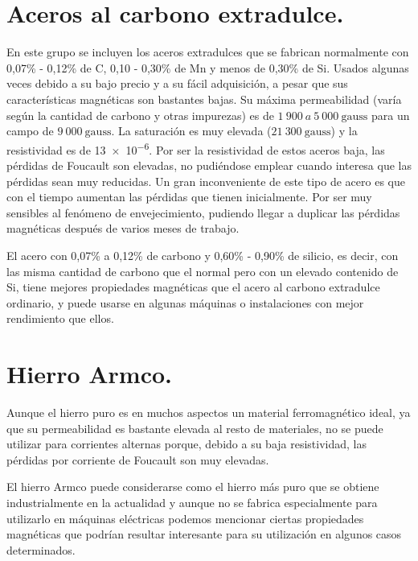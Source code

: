 \documentclass[12pt,a4paper]{article}
\begin{document}
\section{Aceros al carbono extradulce.}

En este grupo se incluyen los aceros extradulces que se fabrican normalmente con 0,07\% - 0,12\% de C, 0,10 - 0,30\% de Mn y menos de 0,30\% de Si. Usados algunas veces debido a su bajo precio y a su fácil adquisición, a pesar que sus características magnéticas son bastantes bajas. Su máxima permeabilidad (varía según la cantidad de carbono y otras impurezas) es de $1\ 900 \ a \ 5\  000 \ \mathrm{gauss}$ para un campo de $9\ 000 \ \mathrm{gauss}$. La saturación es muy elevada ($21\ 300 \ \mathrm{gauss}$) y la resistividad es de \SI{13e-6}{\Omega}. Por ser la resistividad de estos aceros baja, las pérdidas de Foucault son elevadas, no pudiéndose emplear cuando interesa que las pérdidas sean muy reducidas. Un gran inconveniente de este tipo de acero es que con el tiempo aumentan las pérdidas que tienen inicialmente. Por ser muy sensibles al fenómeno de envejecimiento, pudiendo llegar a duplicar las pérdidas magnéticas después de varios meses de trabajo.

El acero con 0,07\% a 0,12\% de carbono y 0,60\% - 0,90\% de silicio, es decir, con las misma cantidad de carbono que el normal pero con un elevado contenido de Si, tiene mejores propiedades magnéticas que el acero al carbono extradulce ordinario, y puede usarse en algunas máquinas o instalaciones con mejor rendimiento que ellos.

\section{Hierro Armco.}

Aunque el hierro puro es en muchos aspectos un material ferromagnético ideal, ya que su permeabilidad es bastante elevada al resto de materiales, no se puede utilizar para corrientes alternas porque, debido a su baja resistividad, las pérdidas por corriente de Foucault son muy elevadas.

El hierro Armco puede considerarse como el hierro más puro que se obtiene industrialmente en la actualidad y aunque no se fabrica especialmente para utilizarlo en máquinas eléctricas podemos mencionar ciertas propiedades magnéticas que podrían resultar interesante para su utilización en algunos casos determinados.
\end{document}
